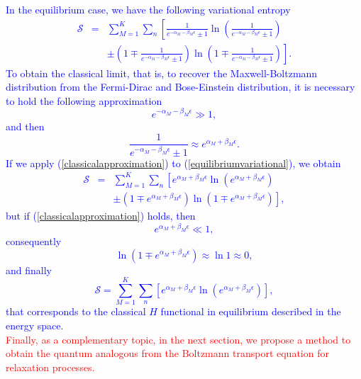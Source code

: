 \documentclass{article}
\newcommand{\Ss}{\mathcal{S}}
\begin{document}
\textcolor{blue}{In the equilibrium case, we have the following variational entropy
\begin{eqnarray}
    \Ss&=& \sum_{M=1}^{K}\sum_{n}
        \left[
                \frac{1}{e^{-\alpha_M-\beta_M \epsilon}\pm 1} \ln 
                    \left(
                            \frac{1}{e^{-\alpha_M-\beta_M \epsilon}\pm 1}
                    \right)
        \right. \nonumber \\
          && \pm \left. \left(
                        1 \mp \frac{1}{e^{-\alpha_M-\beta_M \epsilon}\pm 1}
                  \right) \ln
                \left(
                        1 \mp \frac{1}{e^{-\alpha_M-\beta_M \epsilon}\pm 1}            
                \right) \right]. \label{equilibriumvariational}
\end{eqnarray}
To obtain the classical limit, that is, to recover the Maxwell-Boltzmann distribution from the Fermi-Dirac and Bose-Einstein distribution, it is necessary to hold the following approximation
\begin{equation}
    e^{-\alpha_M-\beta_M \epsilon}\gg 1, \label{classicalapproximation}
\end{equation}
and then
\begin{equation}
    \frac{1}{e^{-\alpha_M-\beta_M \epsilon}\pm 1} \approx e^{\alpha_M+\beta_M \epsilon}.
\end{equation}
If we apply (\ref{classicalapproximation}) to (\ref{equilibriumvariational}), we obtain
\begin{eqnarray}
    \Ss&=& \sum_{M=1}^{K}\sum_{n}
        \left[
                e^{\alpha_M+\beta_M \epsilon} \ln 
                    \left(
                            e^{\alpha_M+\beta_M \epsilon}
                    \right)
        \right. \nonumber \\
          && \pm \left. \left(
                        1 \mp e^{\alpha_M+\beta_M \epsilon}
                  \right) \ln
                \left(
                        1 \mp e^{\alpha_M+\beta_M \epsilon}            
                \right) \right],
\end{eqnarray}
but if (\ref{classicalapproximation}) holds, then 
\begin{equation}
     e^{\alpha_M+\beta_M \epsilon}\ll 1,
\end{equation}
consequently 
\begin{equation}
    \ln(1\mp e^{\alpha_M+\beta_M \epsilon}) \approx \ln 1 \approx 0,
\end{equation}
and finally
\begin{equation}
    \Ss=\sum_{M=1}^{K}\sum_{n}
        \left[
                e^{\alpha_M+\beta_M \epsilon} \ln 
                    \left(
                            e^{\alpha_M+\beta_M \epsilon}
                    \right)
        \right],
\end{equation}
that corresponds to the classical $H$ functional in equilibrium described in the energy space.}\\
\textcolor{red}{Finally, as a complementary topic, in the next section, we propose a method to obtain the quantum analogous from the Boltzmann transport equation for relaxation processes.}
\end{document}

